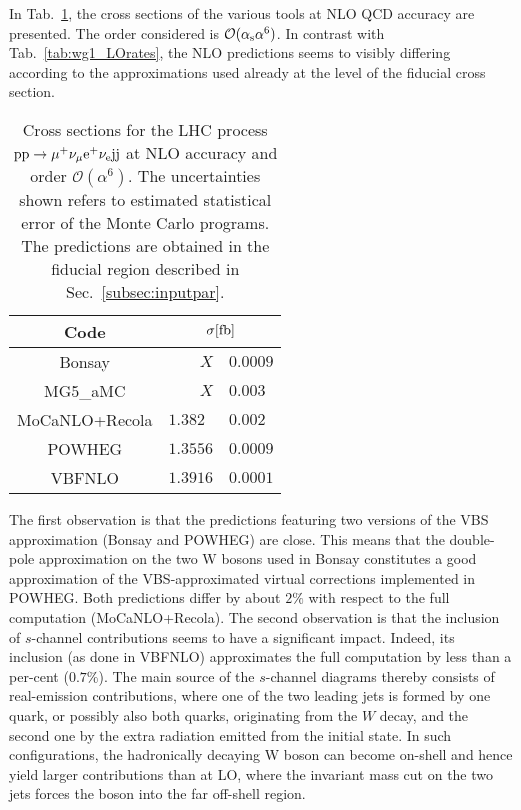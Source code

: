 In Tab.~\ref{tab:wg1_NLOrates}, the cross sections of the various tools at NLO QCD accuracy are presented.
The order considered is $\mathcal{O}(\alpha_{\rm s}\alpha^6)$.
In contrast with Tab.~\ref{tab:wg1_LOrates}, the NLO predictions seems to visibly differing according to the approximations used already at the level of the fiducial cross section.

\begin{table}[h!]
    \centering
    \begin{tabular}{c|r@{ $\pm$ }l}
      Code  &  \multicolumn{2}{c}{$\sigma[\rm{fb}]$}  \\
        \hline
        \hline
        {\sc Bonsay}  &  $X$ & $0.0009$  \\
        {\sc MG5\_aMC}&  $X $ & $0.003$  \\
        {\sc MoCaNLO+Recola}  &  $ 1.382\phantom{0}$ & $0.002$ \\
        {\sc POWHEG}  &  $1.3556$ & $0.0009$  \\
        {\sc VBFNLO}  &  $1.3916$ & $0.0001$  \\
    \end{tabular}
    \caption{\label{tab:wg1_NLOrates} Cross sections for the LHC process ${\rm p}{\rm p}\to\mu^+\nu_\mu{\rm e}^+\nu_{\rm e}{\rm j}{\rm j}$ at NLO accuracy and order $\mathcal{O}(\alpha^6)$.
    The uncertainties shown refers to estimated statistical error of the Monte Carlo programs.
    The predictions are obtained in the fiducial region described in Sec.~\ref{subsec:inputpar}.
    }
\end{table}

The first observation is that the predictions featuring two versions of the VBS approximation ({\sc Bonsay} and {\sc POWHEG}) are close.
This means that the double-pole approximation on the two W bosons used in {\sc Bonsay} constitutes a good approximation of the VBS-approximated virtual corrections implemented in {\sc POWHEG}.
Both predictions differ by about $2\%$ with respect to the full computation ({\sc MoCaNLO+Recola}).
The second observation is that the inclusion of $s$-channel contributions seems to have a significant impact.
Indeed, its inclusion (as done in {\sc VBFNLO}) approximates the full computation by less than a per-cent ($0.7\%$).
The main source of the $s$-channel diagrams thereby consists of
real-emission contributions, where one of the two leading jets is formed
by one quark, or possibly also both quarks, originating from the $W$
decay, and the second one by the extra radiation emitted from the
initial state. In such configurations, the hadronically decaying W boson
can become on-shell and hence yield larger contributions than at LO, where the
invariant mass cut on the two jets forces the boson into the far
off-shell region.
